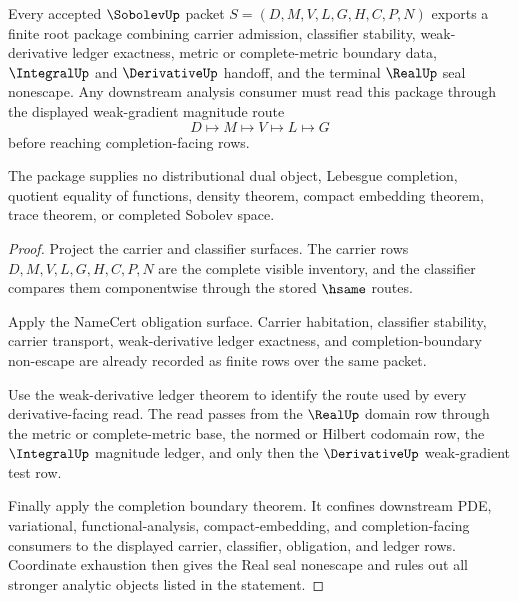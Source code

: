 \begin{theorem}
\label{thm:sobolev-weak-derivative-root-unblock-package}
Every accepted $\SobolevUp$ packet $S=(D,M,V,L,G,H,C,P,N)$ exports a finite root package combining carrier admission, classifier stability, weak-derivative ledger exactness, metric or complete-metric boundary data, $\IntegralUp$ and $\DerivativeUp$ handoff, and the terminal $\RealUp$ seal nonescape. Any downstream analysis consumer must read this package through the displayed weak-gradient magnitude route
$$
D \longmapsto M \longmapsto V \longmapsto L \longmapsto G
$$
before reaching completion-facing rows.

The package supplies no distributional dual object, Lebesgue completion, quotient equality of functions, density theorem, compact embedding theorem, trace theorem, or completed Sobolev space.
\end{theorem}
\begin{proof}
Project the carrier and classifier surfaces. The carrier rows $D,M,V,L,G,H,C,P,N$ are the complete visible inventory, and the classifier compares them componentwise through the stored $\hsame$ routes.

Apply the NameCert obligation surface. Carrier habitation, classifier stability, carrier transport, weak-derivative ledger exactness, and completion-boundary non-escape are already recorded as finite rows over the same packet.

Use the weak-derivative ledger theorem to identify the route used by every derivative-facing read. The read passes from the $\RealUp$ domain row through the metric or complete-metric base, the normed or Hilbert codomain row, the $\IntegralUp$ magnitude ledger, and only then the $\DerivativeUp$ weak-gradient test row.

Finally apply the completion boundary theorem. It confines downstream PDE, variational, functional-analysis, compact-embedding, and completion-facing consumers to the displayed carrier, classifier, obligation, and ledger rows. Coordinate exhaustion then gives the Real seal nonescape and rules out all stronger analytic objects listed in the statement.
\end{proof}

